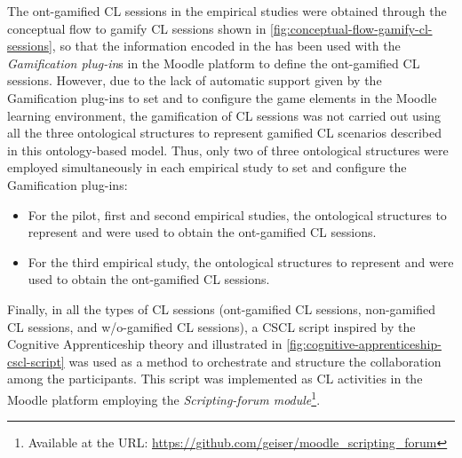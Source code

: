 The ont-gamified CL sessions in the empirical studies were obtained through the conceptual flow to gamify CL sessions shown in \autoref{fig:conceptual-flow-gamify-cl-sessions}, so that the information encoded in the  has been used with the \emph{Gamification plug-in}s in the Moodle platform to define the ont-gamified CL sessions.
However, due to the lack of automatic support given by the Gamification plug-ins to set and to configure the game elements in the Moodle learning environment, the gamification of CL sessions was not carried out using all the three ontological structures to represent gamified CL scenarios described in this ontology-based model.
Thus, only two of three ontological structures were employed simultaneously in each empirical study to set and configure the Gamification plug-ins:

\begin{itemize}
\item For the pilot, first and second empirical studies, the ontological structures to represent  and  were used to obtain the ont-gamified CL sessions.

\item For the third empirical study, the ontological structures to represent  and  were used to obtain the ont-gamified CL sessions.
\end{itemize}

Finally, in all the types of CL sessions (ont-gamified CL sessions, non-gamified CL sessions, and w/o-gamified CL sessions), a CSCL script inspired by the Cognitive Apprenticeship theory and illustrated in \autoref{fig:cognitive-apprenticeship-cscl-script} was used as a method to orchestrate and structure the collaboration among the participants.
This script was implemented as CL activities in the Moodle platform employing the \emph{Scripting-forum module}\footnote{Available at the URL: \url{https://github.com/geiser/moodle\_scripting\_forum}}.


